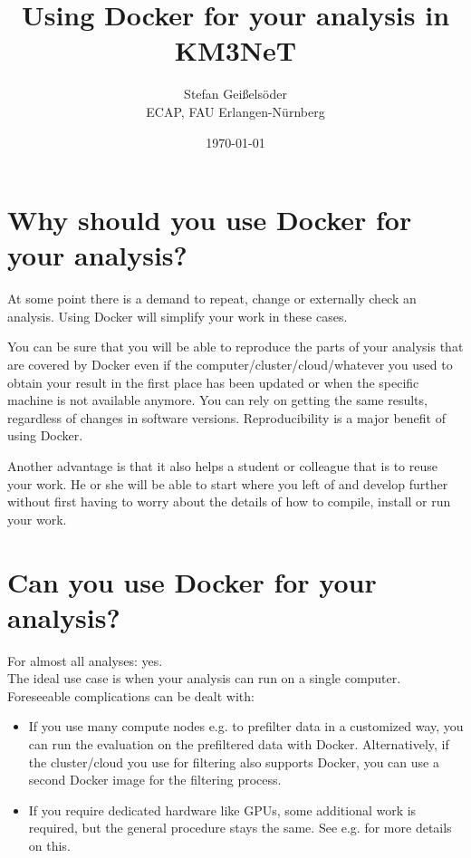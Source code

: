 \documentclass[a4paper, twoside, 11pt]{article}
\begin{document}
\title{Using Docker for your analysis in KM3NeT}
\author{Stefan Geißelsöder\\
ECAP, FAU Erlangen-Nürnberg}
\date{\today}
\maketitle

\section{Why should you use Docker for your analysis?}

At some point there is a demand to repeat, change or externally check an analysis. 
Using Docker will simplify your work in these cases. 

You can be sure that you will be able to reproduce the parts 
of your analysis that are covered by Docker even if the 
computer/cluster/cloud/whatever you used to obtain your result in the first place 
has been updated or when the specific machine is not available anymore.
You can rely on getting the same results, 
regardless of changes in software versions. 
Reproducibility is a major benefit of using Docker. 

Another advantage is that it also helps a student or colleague that is to reuse your work. 
He or she will be able to start where you left of and develop further 
without first having to worry about the details of how to compile, install or run your work.  


\section{Can you use Docker for your analysis?}

For almost all analyses: yes. \\
The ideal use case is when your analysis can run on a single computer. 
Foreseeable complications can be dealt with:
\begin{itemize}
 \item If you use many compute nodes e.g. to prefilter data in a customized way, 
 you can run the evaluation on the prefiltered data with Docker. 
 Alternatively, if the cluster/cloud you use for filtering also supports Docker, 
 you can use a second Docker image for the filtering process. 
 \item If you require dedicated hardware like GPUs, some additional work is required, 
 but the general procedure stays the same. 
 See e.g. \cite{nvidia:docker} for more details on this. 
\end{itemize}
\end{document}
